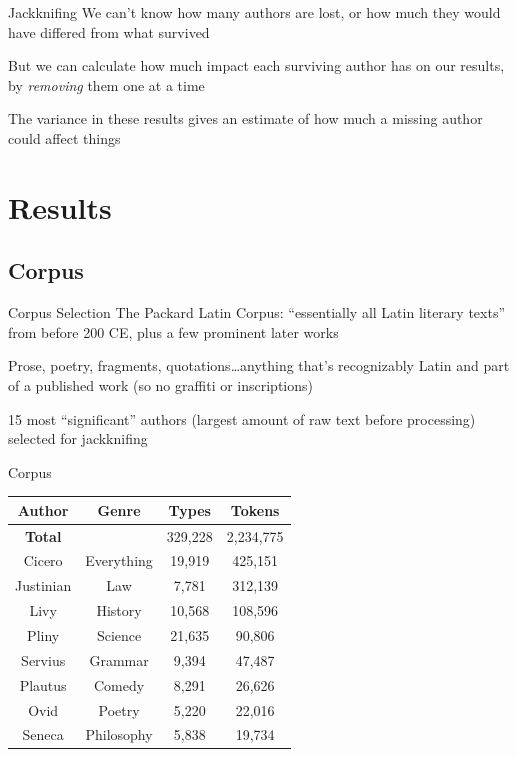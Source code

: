 \documentclass{beamer}
\begin{document}
\begin{frame}{Jackknifing}
We can't know how many authors are lost, or how much they would have differed from what survived

But we can calculate how much impact each surviving author has on our results, by \emph{removing} them one at a time

The variance in these results gives an estimate of how much a missing author could affect things
\end{frame}

\section{Results}

\subsection{Corpus}

\begin{frame}{Corpus Selection}
The Packard Latin Corpus: ``essentially all Latin literary texts'' from before 200 CE, plus a few prominent later works

Prose, poetry, fragments, quotations…anything that's recognizably Latin and part of a published work (so no graffiti or inscriptions)

15 most ``significant'' authors (largest amount of raw text before processing) selected for jackknifing
\end{frame}

\begin{frame}{Corpus}
\begin{table}
\begin{tabular}{|c|c|c|c|}
\hline
\textbf{Author} & \textbf{Genre} & \textbf{Types} & \textbf{Tokens} \\\hline
\textbf{Total} & & 329,228 & 2,234,775 \\\hline\hline
Cicero & Everything & 19,919 & 425,151 \\\hline
Justinian & Law & 7,781 & 312,139 \\\hline
Livy & History & 10,568 & 108,596 \\\hline
Pliny & Science & 21,635 & 90,806 \\\hline
Servius & Grammar & 9,394 & 47,487 \\\hline
Plautus & Comedy & 8,291 & 26,626 \\\hline
Ovid & Poetry & 5,220 & 22,016 \\\hline
Seneca & Philosophy & 5,838 & 19,734 \\\hline
\end{tabular}
\end{table}
\end{frame}
\end{document}
